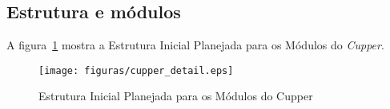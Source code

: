 \subsection{Estrutura e módulos}

A figura~\ref{fig:cupper-detail} mostra a Estrutura Inicial Planejada para os 
Módulos do \textit{Cupper}.

\begin{figure}[H]
  \centering
  \texttt{[image: figuras/cupper\_detail.eps]}
  \caption{Estrutura Inicial Planejada para os Módulos do Cupper}
  \label{fig:cupper-detail}
\end{figure}

